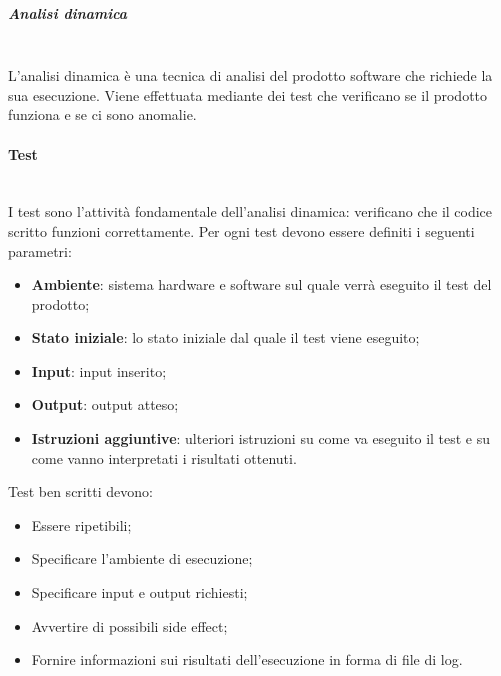 														
			\subparagraph{Analisi dinamica} \mbox{}\\
			L’analisi dinamica è una tecnica di analisi del prodotto software che richiede la sua esecuzione. Viene effettuata  mediante dei test che verificano se il prodotto funziona e se ci sono anomalie. 
			
		\paragraph{Test} \mbox{}\\	
		I test sono l'attività fondamentale dell'analisi dinamica: verificano che il codice scritto funzioni correttamente.
		Per ogni test devono  essere definiti i seguenti parametri:
		\begin{itemize}
			\item \textbf{Ambiente}: sistema hardware e software sul quale verrà eseguito il test del prodotto;
			\item \textbf{Stato iniziale}: lo stato iniziale dal quale il test viene eseguito;
			\item \textbf{Input}: input inserito;
			\item \textbf{Output}: output atteso;
			\item \textbf{Istruzioni aggiuntive}: ulteriori istruzioni su come va eseguito il test e su come vanno interpretati i risultati ottenuti.
		\end{itemize}
		Test ben scritti devono:
		\begin{itemize}
			\item Essere ripetibili;
			\item Specificare l'ambiente di esecuzione;
			\item Specificare input e output richiesti;
			\item Avvertire di possibili side effect;
			\item Fornire informazioni sui risultati dell'esecuzione in forma di file di log.
		\end{itemize}	
			
